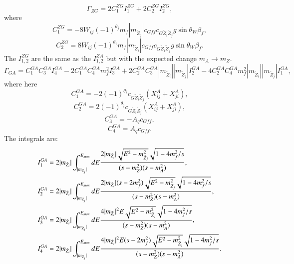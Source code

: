 \documentclass[final,3p,times]{elsarticle}
\begin{document}
\begin{equation}
\Gamma_{Z G} = 2C_{1}^{Z G}I_{1}^{Z G} + 2C_{2}^{Z G}I_{2}^{Z G},
\end{equation}
where
\begin{equation}
C_{1}^{Z G} = -8W_{ij}(-1)^{\theta_j}m_{f}|m_{\tilde{Z}_j}|c_{G f f} c_{G \tilde{Z}_i \tilde{Z}_j} g \sin\theta_W \beta_{f},
\end{equation}
\begin{equation}
C_{2}^{Z G} = 8W_{ij}(-1)^{\theta_i}m_{f}|m_{\tilde{Z}_i}|c_{G f f} c_{G \tilde{Z}_i \tilde{Z}_j} g \sin\theta_W \beta_{f}.
\end{equation}
The $I_{1,2}^{Z G}$ are the same as the $I_{1,2}^{Z A}$ but with the expected change $m_{A} \rightarrow m_{Z}$.
\begin{equation}
\Gamma_{G A} = C_{1}^{G A}C_{3}^{G A}I_{4}^{G A} - 2C_{1}^{GA}C_{4}^{GA}m_{f}^2I_{3}^{G A} + 2C_{2}^{G A} C_{3}^{G A}|m_{\tilde{Z}_i}||m_{\tilde{Z}_j}|I_{2}^{G A} - 4C_{2}^{G A}C_{4}^{G A}m_{f}^2|m_{\tilde{Z}_i}||m_{\tilde{Z}_j}|I_{1}^{G A},
\end{equation}
where here
\begin{equation}
C_{1}^{G A} = -2(-1)^{\theta_i}c_{G \tilde{Z}_i \tilde{Z}_j}(X_{ij}^A + X_{ji}^A),
\end{equation}
\begin{equation}
C_{2}^{G A} = 2(-1)^{\theta_j}c_{G \tilde{Z}_i \tilde{Z}_j}(X_{ij}^A + X_{ji}^A),
\end{equation}
\begin{equation}
C_{3}^{G A} = -A_{q} c_{G f f},
\end{equation}
\begin{equation}
C_{4}^{G A} = A_{q} c_{G f f}.
\end{equation}
The integrals are:
\begin{align}
I_{1}^{G A} &= 2|m_{\tilde{Z}_i}|\int_{|m_{\tilde{Z}_j}|}^{E_{max}}dE {2|m_{\tilde{Z}_i}|\sqrt{E^2 - m_{\tilde{Z}_j}^2}\sqrt{1-4m_{f}^2/s} \over (s-m_{Z}^2)(s-m_{A}^2)}, \\
I_{2}^{G A} &= 2|m_{\tilde{Z}_i}|\int_{|m_{\tilde{Z}_j}|}^{E_{max}}dE {2|m_{\tilde{Z}_i}| (s - 2m_{f}^2)\sqrt{E^2 - m_{\tilde{Z}_j}^2}\sqrt{1-4m_{f}^2/s} \over (s-m_{Z}^2)(s-m_{A}^2)}, \\
I_{3}^{G A} &= 2|m_{\tilde{Z}_i}|\int_{|m_{\tilde{Z}_j}|}^{E_{max}}dE {4|m_{\tilde{Z}_i}|^2 E \sqrt{E^2 - m_{\tilde{Z}_j}^2}\sqrt{1-4m_{f}^2/s} \over (s-m_{Z}^2)(s-m_{A}^2)}, \\
I_{4}^{G A} &= 2|m_{\tilde{Z}_i}|\int_{|m_{\tilde{Z}_j}|}^{E_{max}}dE {4|m_{\tilde{Z}_i}|^2 E (s-2m_{f}^2)\sqrt{E^2 - m_{\tilde{Z}_j}^2}\sqrt{1-4m_{f}^2/s} \over (s-m_{Z}^2)(s-m_{A}^2)}.
\end{align}
\end{document}
